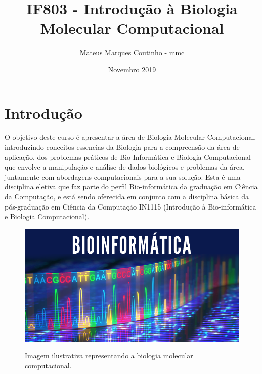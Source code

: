 \documentclass{article}
\title{IF803 - Introdução à Biologia Molecular Computacional}
\author{Mateus Marques Coutinho - mmc }
\date{Novembro 2019}
\begin{document}
\maketitle

\section{Introdução}
O objetivo deste curso é apresentar a área de Biologia Molecular Computacional, introduzindo conceitos essencias da Biologia para a compreensão da área de aplicação, dos problemas práticos de Bio-Informática e Biologia Computacional que envolve a manipulação e análise de dados biológicos e problemas da área, juntamente com abordagens computacionais para a sua solução.
Esta é uma disciplina eletiva que faz parte do perfil Bio-informática da graduação em Ciência da Computação, e está sendo oferecida em conjunto com a disciplina básica da pós-graduação em Ciência da Computação IN1115 (Introdução à Bio-informática e Biologia Computacional). \cite{Intro}

\begin{figure}[h!]
\centering
\includegraphics[scale=0.4]{Bioinformatica[2].png}
\caption{Imagem ilustrativa representando a biologia molecular computacional.} \cite{Img1}
\label{fig:Bioinf}
\end{figure}
\end{document}
